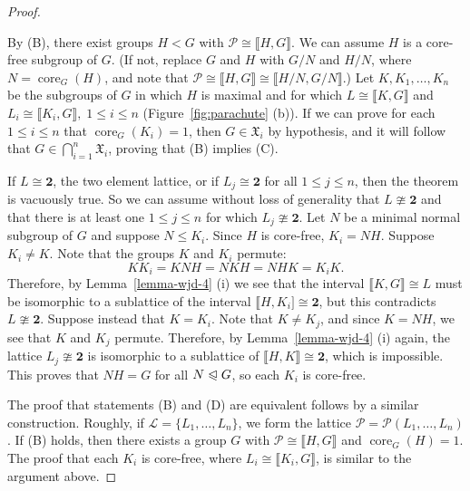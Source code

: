 \documentclass{gen-j-l}
\newcommand{\lb}{\ensuremath{\llbracket}}
\newcommand{\rb}{\ensuremath{\rrbracket}}
\newcommand{\<}{\ensuremath{\langle}}
\renewcommand{\>}{\ensuremath{\rangle}}
\theoremstyle{plain}
\theoremstyle{definition}
\theoremstyle{remark}
\numberwithin{theorem}{section}
\numberwithin{claim}{section}
\numberwithin{equation}{section}
\numberwithin{conjecture}{section}
\renewcommand{\leq}{\ensuremath{\leqslant}}
\newcommand{\subnormal}{\ensuremath{\trianglelefteqslant}}
\newcommand{\core}{\ensuremath{\operatorname{core}}}
\newcommand{\2}{\ensuremath{\mathbf{2}}}
\newcommand{\3}{\ensuremath{\mathbf{3}}}
\newcommand{\sG}{\ensuremath{\mathfrak{X}}}
\newcommand{\sL}{\ensuremath{\mathscr{L}}}
\newcommand{\sP}{\ensuremath{\mathscr{P}}}
\begin{document}
\begin{proof}
\begin{figure}[centering]
\begin{center}
{
}
\end{center}
\end{figure}
By (B), there exist groups $H <G$ with $\sP \cong \lb H,G \rb$.  We can assume $H$
is a core-free subgroup of $G$.  (If not, replace $G$ and $H$ with
$G/N$ and $H/N$, where $N=\core_G(H)$, and note that 
$\sP \cong \lb H,G \rb \cong \lb H/N,G/N \rb$.)
Let $K, K_1, \dots, K_n$ be the subgroups of $G$ in which $H$ is maximal
and for which
$L \cong \lb K, G \rb$ and $L_i \cong \lb K_i, G \rb,\; 1\leq i\leq n$ (Figure~\ref{fig:parachute} (b)).
If we can prove for each $1\leq i\leq n$ that $\core_G(K_i)=1$, then $G\in
\sG_i$ by hypothesis, and it will follow that $G \in \bigcap\limits_{i=1}^n
\sG_i$, proving that (B) implies (C). 

If $L \cong \2$, the two element lattice, or if $L_j\cong \2$ for all $1\leq
j\leq n$, then the theorem is vacuously true.  So we can assume without loss of
generality that $L\ncong \2$ and that there is at least one $1\leq j\leq n$ for which
$L_j\ncong \2$. Let $N$ be a minimal normal subgroup of $G$ and suppose $N\leq
K_i$.  Since $H$ is core-free, $K_i = NH$.  
Suppose $K_i \neq K$.
Note that the groups $K$ and $K_i$ permute:
\[
K K_i = K NH = NKH = NHK = K_i K.
\]
Therefore, by Lemma~\ref{lemma-wjd-4} (i) we see that the interval $\lb K,G \rb \cong L$
must be isomorphic to a sublattice of the interval $\lb H,K_i]\cong \2$, but this
contradicts $L\ncong \2$.
Suppose instead that $K = K_i$. Note that $K \neq K_j$, and since $K=NH$, we
see that $K$ and $K_j$ permute.  Therefore, by Lemma~\ref{lemma-wjd-4} (i)
again, the lattice $L_j\ncong \2$ is isomorphic to a sublattice of $\lb H,K \rb\cong
\2$, which is impossible.  This proves that $NH = G$ for all $N\subnormal G$, so
each $K_i$ is core-free. 

The proof that statements (B) and (D) are equivalent follows by a similar
construction.  Roughly, if
$\sL = \{L_1, \dots, L_n\}$, we form  the lattice $\sP = \sP(L_1, \dots, L_n)$.
If (B) holds, then there exists a group $G$ with $\sP \cong \lb H, G \rb$ and
$\core_G(H)=1$.  The proof that each $K_i$ is core-free, where $L_i\cong \lb K_i,G \rb$, is
similar to the argument above.
\end{proof}
\end{document}
